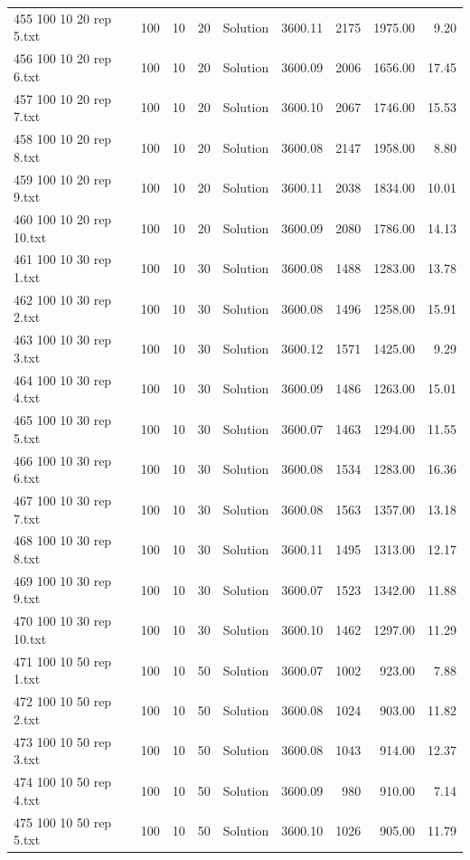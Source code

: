 \begin{longtable}{lrrllrrrr}
455 100 10 20 rep 5.txt & 100 & 10 & 20 & Solution & 3600.11 & 2175 & 1975.00 &  9.20\\
456 100 10 20 rep 6.txt & 100 & 10 & 20 & Solution & 3600.09 & 2006 & 1656.00 & 17.45\\
457 100 10 20 rep 7.txt & 100 & 10 & 20 & Solution & 3600.10 & 2067 & 1746.00 & 15.53\\
458 100 10 20 rep 8.txt & 100 & 10 & 20 & Solution & 3600.08 & 2147 & 1958.00 &  8.80\\
459 100 10 20 rep 9.txt & 100 & 10 & 20 & Solution & 3600.11 & 2038 & 1834.00 & 10.01\\
460 100 10 20 rep 10.txt & 100 & 10 & 20 & Solution & 3600.09 & 2080 & 1786.00 & 14.13\\
461 100 10 30 rep 1.txt & 100 & 10 & 30 & Solution & 3600.08 & 1488 & 1283.00 & 13.78\\
462 100 10 30 rep 2.txt & 100 & 10 & 30 & Solution & 3600.08 & 1496 & 1258.00 & 15.91\\
463 100 10 30 rep 3.txt & 100 & 10 & 30 & Solution & 3600.12 & 1571 & 1425.00 &  9.29\\
464 100 10 30 rep 4.txt & 100 & 10 & 30 & Solution & 3600.09 & 1486 & 1263.00 & 15.01\\
465 100 10 30 rep 5.txt & 100 & 10 & 30 & Solution & 3600.07 & 1463 & 1294.00 & 11.55\\
466 100 10 30 rep 6.txt & 100 & 10 & 30 & Solution & 3600.08 & 1534 & 1283.00 & 16.36\\
467 100 10 30 rep 7.txt & 100 & 10 & 30 & Solution & 3600.08 & 1563 & 1357.00 & 13.18\\
468 100 10 30 rep 8.txt & 100 & 10 & 30 & Solution & 3600.11 & 1495 & 1313.00 & 12.17\\
469 100 10 30 rep 9.txt & 100 & 10 & 30 & Solution & 3600.07 & 1523 & 1342.00 & 11.88\\
470 100 10 30 rep 10.txt & 100 & 10 & 30 & Solution & 3600.10 & 1462 & 1297.00 & 11.29\\
471 100 10 50 rep 1.txt & 100 & 10 & 50 & Solution & 3600.07 & 1002 & 923.00 &  7.88\\
472 100 10 50 rep 2.txt & 100 & 10 & 50 & Solution & 3600.08 & 1024 & 903.00 & 11.82\\
473 100 10 50 rep 3.txt & 100 & 10 & 50 & Solution & 3600.08 & 1043 & 914.00 & 12.37\\
474 100 10 50 rep 4.txt & 100 & 10 & 50 & Solution & 3600.09 & 980 & 910.00 &  7.14\\
475 100 10 50 rep 5.txt & 100 & 10 & 50 & Solution & 3600.10 & 1026 & 905.00 & 11.79\\

\end{longtable}

